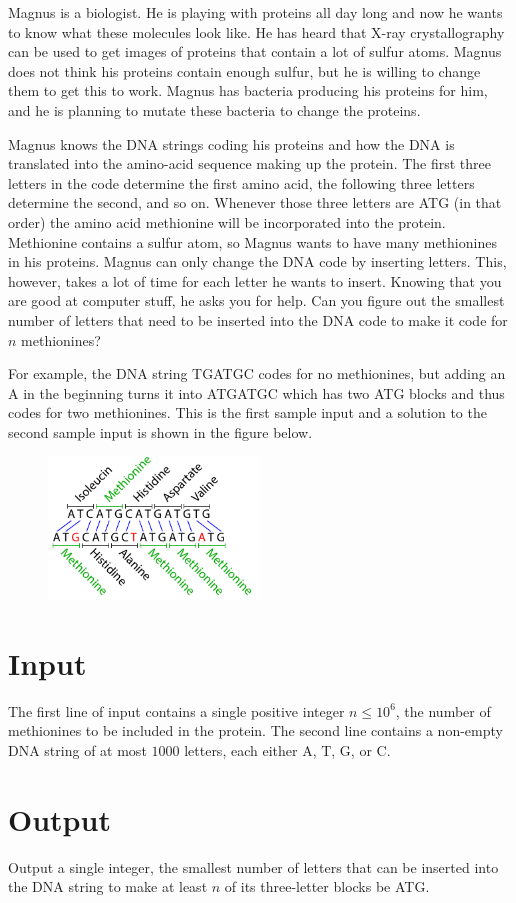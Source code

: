 

Magnus is a biologist. He is playing with proteins all day long and now he wants to know what these
molecules look like. He has heard that X-ray crystallography can be used to get images of proteins that contain a lot of sulfur atoms. Magnus does not think his proteins contain enough sulfur,
but he is willing to change them to get this to work. Magnus has bacteria producing his proteins for
him, and he is planning to mutate these bacteria to change the proteins.

Magnus knows the DNA strings coding his proteins and how the DNA is translated into the amino-acid
sequence making up the protein. The first three letters in the code determine the first amino acid,
the following three letters determine the second, and so on. Whenever those three letters are ATG
(in that order) the amino acid methionine will be incorporated into the protein. Methionine contains
a sulfur atom, so Magnus wants to have many methionines in his proteins. Magnus can only change the DNA code by inserting letters. This, however, takes
a lot of time for each letter he wants to insert. Knowing that you are good at computer stuff, he
asks you for help. Can you figure out the smallest number of letters that need to be inserted into
the DNA code to make it code for $n$ methionines?

For example, the DNA string TGATGC codes for no methionines, but adding an A in the beginning turns
it into ATGATGC which has two ATG blocks and thus codes for two methionines. This is the first
sample input and a solution to the second sample input is shown in the figure below.

\begin{figure}[h]
  \centering
  \includegraphics[width=0.5\textwidth]{example}
\end{figure}

\section*{Input}
The first line of input contains a single positive integer $n\leq10^6$, the number of methionines to
be included in the protein. The second line contains a non-empty DNA string of at most $1000$
letters, each either A, T, G, or C.

\section*{Output}
Output a single integer, the smallest number of letters that can be inserted into the DNA string to
make at least $n$ of its three-letter blocks be ATG.
